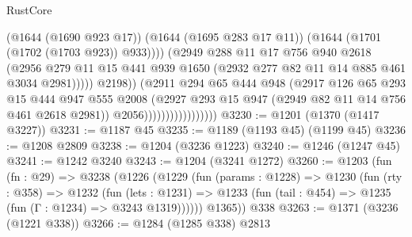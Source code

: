 \begin{lexlean}{RustCore}
\begin{coremodule}
                                              (@1644 (@1690 @923 @17))
                                              (@1644 (@1695 @283 @17 @11))
                                              (@1644 (@1701 (@1702 (@1703 @923)) @933))))
                                          (@2949
                                            @288
                                            @11
                                            @17
                                            @756
                                            @940
                                            @2618
                                            (@2956
                                              @279
                                              @11
                                              @15
                                              @441
                                              @939
                                              @1650
                                              (@2932 @277 @82 @11 @14 @885 @461 @3034 @2981)))))
                                      @2198))
                                  (@2911
                                    @294
                                    @65
                                    @444
                                    @948
                                    (@2917
                                      @126
                                      @65
                                      @293
                                      @15
                                      @444
                                      @947
                                      @555
                                      @2008
                                      (@2927
                                        @293
                                        @15
                                        @947
                                        (@2949 @82 @11 @14 @756 @461 @2618 @2981))
                                      @2056)))))))))))))))))
@3230 := @1201 (@1370 (@1417 @3227))
@3231 := @1187 @45
@3235 := @1189 (@1193 @45) (@1199 @45)
@3236 := @1208 @2809
@3238 := @1204 (@3236 @1223)
@3240 := @1246 (@1247 @45)
@3241 := @1242 @3240
@3243 := @1204 (@3241 @1272)
@3260 := @1203
    (fun (fn : @29) =>
    @3238
      (@1226
        (@1229
          (fun (params : @1228) =>
          @1230
            (fun (rty : @358) =>
            @1232
              (fun (lets : @1231) =>
              @1233 (fun (tail : @454) => @1235 (fun (Γ : @1234) => @3243 @1319))))))
        @1365))
    @338
@3263 := @1371 (@3236 (@1221 @338))
@3266 := @1284 (@1285 @338) @2813

\end{coremodule}
\end{lexlean}
